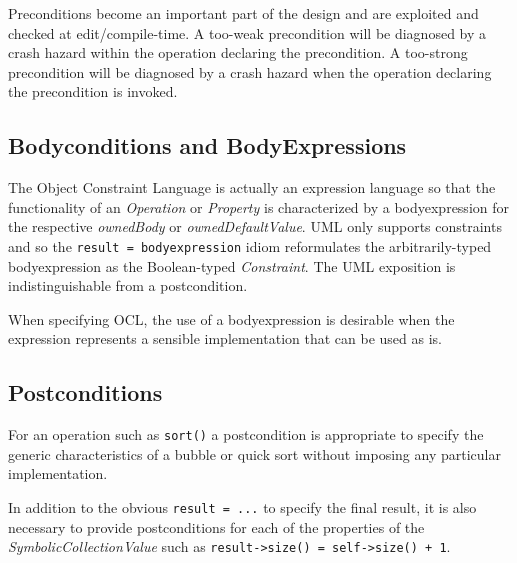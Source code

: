 \documentclass[
]{ceurart}
\begin{document}
Preconditions become an important part of the design and are exploited and checked at edit/compile-time. A too-weak precondition will be diagnosed by a crash hazard within the operation declaring the precondition. A too-strong precondition will be diagnosed by a crash hazard when the operation declaring the precondition is invoked.


\subsection{Bodyconditions and BodyExpressions}

The Object Constraint Language is actually an expression language so that the functionality of an \emph{Operation} or \emph{Property} is characterized by a bodyexpression for the respective \emph{ownedBody} or \emph{ownedDefaultValue}. UML only supports constraints and so the \verb|result = bodyexpression| idiom reformulates the arbitrarily-typed bodyexpression as the Boolean-typed \emph{Constraint}. The UML exposition is indistinguishable from a postcondition.

When specifying OCL, the use of a bodyexpression is desirable when the expression represents a sensible implementation that can be used as is.

\subsection{Postconditions}

For an operation such as \verb|sort()| a postcondition is appropriate to specify the generic characteristics of a bubble or quick sort without imposing any particular implementation. 

In addition to the obvious \verb|result = ...| to specify the final result, it is also necessary to provide postconditions for each of the properties of the \emph{SymbolicCollectionValue} such as 
\verb|result->size() = self->size() + 1|.

\end{document}
